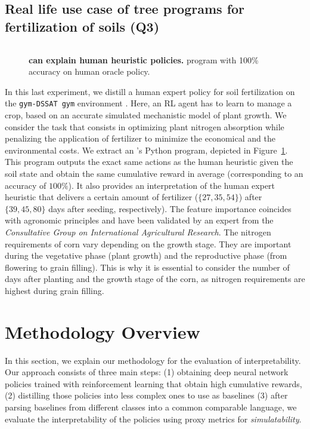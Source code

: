 \subsection{Real life use case of \interpreter tree programs for fertilization of soils (Q3)}
\begin{figure}
\centering
\vspace{-5.6mm}
\footnotesize
\inputminted{Python}{annexes/programmes/play_dssat_oblique_66.2_copy_human.py}
\caption{\textbf{\interpreter can explain human heuristic policies.} \interpreter program with 100\% accuracy on human oracle policy.}
\vspace{-2mm}
\label{fig:dssat-iqdagger}
\end{figure}
In this last experiment, we distill a human expert policy for soil fertilization on the \texttt{gym-DSSAT gym} environment \cite{gautron2023learning}. Here, an RL agent has to learn to manage a crop, based on an accurate simulated mechanistic model of plant growth. 
We consider the task that consists in optimizing plant nitrogen absorption while penalizing the application of fertilizer to minimize the economical and the environmental costs. 
We extract an \interpreter's Python program, depicted in Figure~\ref{fig:dssat-iqdagger}. 
This program outputs the exact same actions as the human heuristic given the soil state and obtain the same cumulative reward in average (corresponding to an accuracy of $100\%$). 
It also provides an interpretation of the human expert heuristic that delivers a certain amount of fertilizer ($\{27, 35, 54\}$) after $\{39, 45, 80\}$ days after seeding, respectively). 
The feature importance coincides with agronomic principles and have been validated by an expert from the \textit{Consultative Group on International Agricultural Research}. 
The nitrogen requirements of corn vary depending on the growth stage. They are important during the vegetative phase (plant growth) and the reproductive phase (from flowering to grain filling). This is why it is essential to consider the number of days after planting and the growth stage of the corn, as nitrogen requirements are highest during grain filling.

\section{Methodology Overview}\label{sec:methodology}
In this section, we explain our methodology for the evaluation of interpretability.
Our approach consists of three main steps: (1) obtaining deep neural network policies trained with reinforcement learning that obtain high cumulative rewards, (2) distilling those policies into less complex ones to use as baselines (3) after parsing baselines from different classes into a common comparable language, we evaluate the interpretability of the policies using proxy metrics for \textit{simulatability}.

